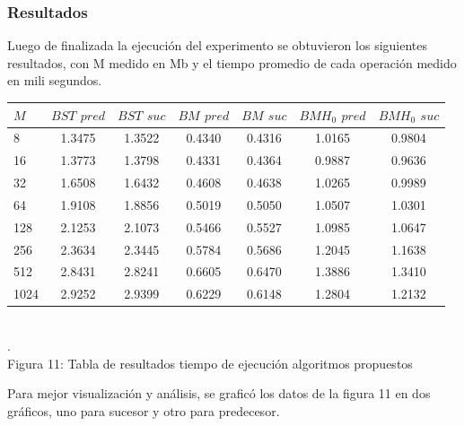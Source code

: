 \documentclass[11pt]{article}
\begin{document}
\subsubsection{Resultados}
Luego de finalizada la ejecución del experimento se obtuvieron los siguientes resultados, con M medido en Mb y el tiempo promedio de cada operación medido en mili segundos.
\begin{center}\begin{tabular}{|l|c|c|c|c|c|c|}
\hline
	$M$ & $BST$ $pred$ & $BST$ $suc$ & $BM$ $pred$ & $BM$ $suc$ & $BMH_{0}$ $pred$ & $BMH_{0}$ $suc$ \\
\hline
8	&   1.3475	&   1.3522	&   0.4340 &	   0.4316 &	   1.0165 &	   0.9804 \\
\hline
16	&   1.3773	&   1.3798	&   0.4331 &	   0.4364 &	   0.9887 &	   0.9636 \\
\hline
32	&   1.6508	&   1.6432	&   0.4608 &	   0.4638 &	   1.0265 &	   0.9989 \\
\hline
64	&   1.9108	&   1.8856	&   0.5019 &	   0.5050 &	   1.0507 &	   1.0301 \\
\hline
128	 &  2.1253	&   2.1073	&   0.5466 &	   0.5527 &	   1.0985 &	   1.0647 \\
\hline
256	 &  2.3634	&   2.3445	&   0.5784 &	   0.5686 &	   1.2045 &	   1.1638 \\
\hline
512	 &  2.8431	&   2.8241	&   0.6605 &	   0.6470 &	   1.3886 &	   1.3410 \\
\hline
1024 &	   2.9252	&   2.9399	&   0.6229 &	   0.6148 &	   1.2804 &	   1.2132 \\ 
\hline
\end{tabular}
\\\scriptsize{\color{white}.\color{black}\\Figura 11: Tabla de resultados tiempo de ejecución algoritmos propuestos}
\end{center}
Para mejor visualización y análisis, se graficó los datos de la figura 11 en dos gráficos, uno para sucesor y otro para predecesor.
\end{document}
